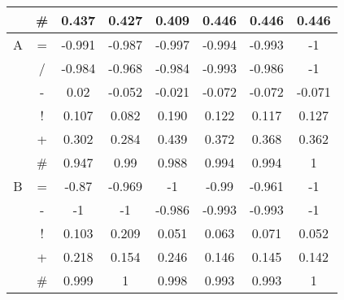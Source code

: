 \documentclass{sfuthesis}
\begin{document}
\begin{table}
\begin{tabular}{cccccccc}
			& \multicolumn{1}{c|}{\#}               & 0.437              & 0.427               & 0.409             & 0.446          & \multicolumn{1}{c|}{0.446}              & 0.446         \\ \hline
			A              & \multicolumn{1}{c|}{=}                & -0.991             & -0.987              & -0.997            & -0.994         & \multicolumn{1}{c|}{-0.993}             & -1            \\
			& \multicolumn{1}{c|}{/}                & -0.984             & -0.968              & -0.984            & -0.993         & \multicolumn{1}{c|}{-0.986}             & -1            \\
			& \multicolumn{1}{c|}{-}                & 0.02               & -0.052              & -0.021            & -0.072         & \multicolumn{1}{c|}{-0.072}             & -0.071        \\
			& \multicolumn{1}{c|}{!}                & 0.107              & 0.082               & 0.190             & 0.122          & \multicolumn{1}{c|}{0.117}              & 0.127         \\
			& \multicolumn{1}{c|}{+}                & 0.302              & 0.284               & 0.439             & 0.372          & \multicolumn{1}{c|}{0.368}              & 0.362         \\
			& \multicolumn{1}{c|}{\#}               & 0.947              & 0.99                & 0.988             & 0.994          & \multicolumn{1}{c|}{0.994}              & 1             \\ \hline
			B              & \multicolumn{1}{c|}{=}                & -0.87              & -0.969              & -1                & -0.99          & \multicolumn{1}{c|}{-0.961}             & -1            \\
			& \multicolumn{1}{c|}{-}                & -1                 & -1                  & -0.986            & -0.993         & \multicolumn{1}{c|}{-0.993}             & -1            \\
			& \multicolumn{1}{c|}{!}                & 0.103              & 0.209               & 0.051             & 0.063          & \multicolumn{1}{c|}{0.071}              & 0.052         \\
			& \multicolumn{1}{c|}{+}                & 0.218              & 0.154               & 0.246             & 0.146          & \multicolumn{1}{c|}{0.145}              & 0.142         \\
			& \multicolumn{1}{c|}{\#}               & 0.999              & 1                   & 0.998             & 0.993          & \multicolumn{1}{c|}{0.993}              & 1             \\ \hline

\end{tabular}
\end{table}
\end{document}
